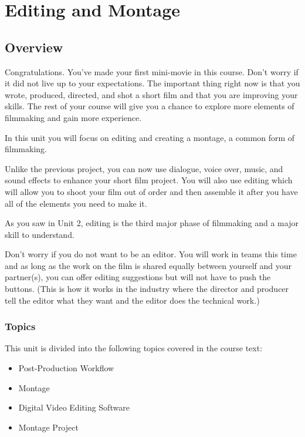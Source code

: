 \documentclass[
]{book}
\providecommand{\tightlist}{%
  \setlength{\itemsep}{0pt}\setlength{\parskip}{0pt}}
\begin{document}
\hypertarget{editing-and-montage}{%
\chapter{Editing and Montage}\label{editing-and-montage}}

\hypertarget{overview-6}{%
\section*{Overview}\label{overview-6}}

Congratulations. You've made your first mini-movie in this course. Don't worry if it did not live up to your expectations. The important thing right now is that you wrote, produced, directed, and shot a short film and that you are improving your skills. The rest of your course will give you a chance to explore more elements of filmmaking and gain more experience.

In this unit you will focus on editing and creating a montage, a common form of filmmaking.

Unlike the previous project, you can now use dialogue, voice over, music, and sound effects to enhance your short film project. You will also use editing which will allow you to shoot your film out of order and then assemble it after you have all of the elements you need to make it.

As you saw in Unit 2, editing is the third major phase of filmmaking and a major skill to understand.

Don't worry if you do not want to be an editor. You will work in teams this time and as long as the work on the film is shared equally between yourself and your partner(s), you can offer editing suggestions but will not have to push the buttons. (This is how it works in the industry where the director and producer tell the editor what they want and the editor does the technical work.)

\hypertarget{topics-6}{%
\subsection*{Topics}\label{topics-6}}

This unit is divided into the following topics covered in the course text:

\begin{itemize}
\tightlist
\item
  Post-Production Workflow
\item
  Montage
\item
  Digital Video Editing Software
\item
  Montage Project
\end{itemize}
\end{document}
